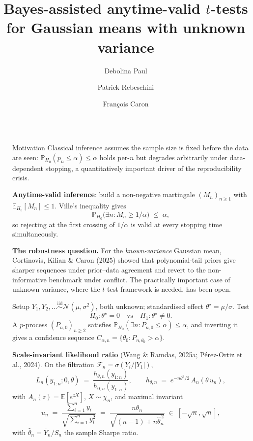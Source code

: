 \documentclass[final]{beamer}
\title{Bayes-assisted anytime-valid \texorpdfstring{$t$}{t}-tests for Gaussian means with unknown variance}
\author{Debolina Paul \and Patrick Rebeschini \and Fran\c{c}ois Caron}
\institute[shortinst]{Department of Statistics, University of Oxford}
\newcommand{\E}{\mathbb{E}}
\newcommand{\Prob}{\mathbb{P}}
\newcommand{\thetahat}{\widehat{\theta}_n}
\newlength{\sepwidth}
\newlength{\colwidth}
\newcommand{\separatorcolumn}{\begin{column}{\sepwidth}\end{column}}
\begin{document}
\begin{frame}[t]
\begin{columns}[t]
\separatorcolumn

\begin{column}{\colwidth}

  \begin{block}{Motivation}
    Classical inference assumes the sample size is fixed before the data are seen: $\Prob_{H_0}(p_n\le\alpha)\le\alpha$ holds per-$n$ but degrades arbitrarily under data-dependent stopping, a quantitatively important driver of the reproducibility crisis.

    \vspace{0.15cm}
    \textbf{Anytime-valid inference}: build a non-negative martingale $(M_n)_{n\ge 1}$ with $\E_{H_0}[M_n]\le 1$. Ville's inequality gives
    \[
      \Prob_{H_0}\!\bigl(\exists n\colon M_n\ge 1/\alpha\bigr)\;\le\;\alpha,
    \]
    so rejecting at the first crossing of $1/\alpha$ is valid at every stopping time simultaneously.

    \vspace{0.15cm}
    \textbf{The robustness question.} For the \emph{known-variance} Gaussian mean, Cortinovis, Kilian \& Caron (2025) showed that polynomial-tail priors give sharper sequences under prior--data agreement and revert to the non-informative benchmark under conflict. The practically important case of \alert{unknown variance}, where the $t$-test framework is needed, has been open.
  \end{block}

  \begin{block}{Setup}
    $Y_1,Y_2,\ldots\stackrel{\mathrm{iid}}{\sim}\mathcal N(\mu,\sigma^2)$, both unknown; standardised effect $\theta^\star=\mu/\sigma$. Test \[
      H_0\colon\theta^\star=0 \quad\text{vs}\quad H_1\colon\theta^\star\neq 0.
    \]
    A \alert{$p$-process} $(P_{n,0})_{n\ge 2}$ satisfies $\Prob_{H_0}(\exists n\colon P_{n,0}\le\alpha)\le\alpha$, and inverting it gives a \alert{confidence sequence} $C_{\alpha,n}=\{\theta_0:P_{n,\theta_0}>\alpha\}$.

    \vspace{0.15cm}
    \textbf{Scale-invariant likelihood ratio} (Wang \& Ramdas, 2025a; P\'erez-Ortiz et al., 2024). On the filtration $\mathcal F_n=\sigma(Y_i/|Y_1|)$,
    \[
      L_n(y_{1:n};0,\theta) \;=\; \frac{h_{\theta,n}(y_{1:n})}{h_{0,n}(y_{1:n})}, \qquad
      h_{\theta,n} \;=\; e^{-n\theta^2/2}\,A_n(\theta\,u_n),
    \]
    with $A_n(z)=\E[e^{zX}]$, $X\sim\chi_n$, and maximal invariant
    \[
      u_n \;=\; \frac{\sum_{i=1}^n y_i}{\sqrt{\sum_{i=1}^n y_i^{2}}} \;=\; \frac{n\thetahat}{\sqrt{(n-1)+n\thetahat^{\,2}}}\;\in\;[-\sqrt n,\sqrt n],
    \]
    with $\thetahat=\bar Y_n/S_n$ the sample Sharpe ratio.


\end{block}
\end{column}
\end{columns}
\end{frame}
\end{document}
